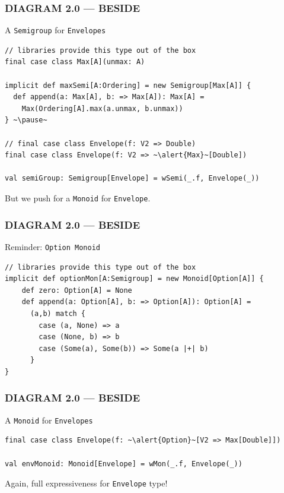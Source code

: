 \documentclass{beamer}
\begin{document}
\begin{frame}[fragile] \frametitle{DIAGRAM 2.0 --- BESIDE}
  \begin{block}{A \texttt{Semigroup} for \texttt{Envelopes}}
  \begin{lstlisting}
// libraries provide this type out of the box
final case class Max[A](unmax: A)

implicit def maxSemi[A:Ordering] = new Semigroup[Max[A]] {
  def append(a: Max[A], b: => Max[A]): Max[A] =
    Max(Ordering[A].max(a.unmax, b.unmax))
} ~\pause~

// final case class Envelope(f: V2 => Double)
final case class Envelope(f: V2 => ~\alert{Max}~[Double])

val semiGroup: Semigroup[Envelope] = wSemi(_.f, Envelope(_))
  \end{lstlisting}
  \end{block}

  But we push for a \texttt{Monoid} for \texttt{Envelope}.
\end{frame}

\begin{frame}[fragile] \frametitle{DIAGRAM 2.0 --- BESIDE}
  \begin{block}{Reminder: \texttt{Option Monoid}}
  \begin{lstlisting}
// libraries provide this type out of the box
implicit def optionMon[A:Semigroup] = new Monoid[Option[A]] {
    def zero: Option[A] = None
    def append(a: Option[A], b: => Option[A]): Option[A] =
      (a,b) match {
        case (a, None) => a
        case (None, b) => b
        case (Some(a), Some(b)) => Some(a |+| b)
      }
}
  \end{lstlisting}
  \end{block}
\end{frame}

\begin{frame}[fragile] \frametitle{DIAGRAM 2.0 --- BESIDE}
  \begin{block}{A \texttt{Monoid} for \texttt{Envelopes}}
  \begin{lstlisting}
final case class Envelope(f: ~\alert{Option}~[V2 => Max[Double]])

val envMonoid: Monoid[Envelope] = wMon(_.f, Envelope(_))
  \end{lstlisting}
  \end{block}

Again, full expressiveness for \texttt{Envelope} type!
\end{frame}
\end{document}
